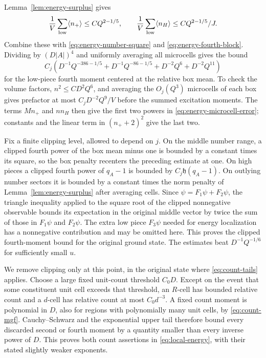 Lemma~\ref{lem:energy-surplus} gives
\begin{equation}\label{eq:energy-gap-counts}
 \frac1V\sum_{\rm low}\langle n_+\rangle\le CQ^{2-1/5},\qquad
 \frac1V\sum_{\rm low}\langle n_H\rangle\le CQ^{2-1/5}/J.
\end{equation}
Combine these with \eqref{eq:energy-number-square} and
\eqref{eq:energy-fourth-block}.  Dividing by $(D|A|)^4$ and uniformly
averaging all microcells gives the bound
\begin{equation}\label{eq:energy-microcell-error}
 C_j\left(D^{-1}Q^{-386-1/5}+D^{-1}Q^{-86-1/5}
                         +D^{-2}Q^6+D^{-2}Q^{11}\right)
\end{equation}
for the low-piece fourth moment centered at the relative box mean.
To check the volume factors, $n^2\le CD^2Q^6$, and averaging the
$O_j(Q^3)$ microcells of each box gives prefactor at most
$C_jD^{-2}Q^9/V$ before the summed excitation moments.
The terms $Mn_+$ and $nn_H$ then give the first two powers in
\eqref{eq:energy-microcell-error}; constants and the linear term in
$(n_++2)^2$ give the last two.

Fix a finite clipping level, allowed to depend on $j$.
On the middle number range, a clipped fourth power of the box mean
minus one is bounded by a constant times its square, so the box penalty
recenters the preceding estimate at one.  On high pieces a clipped
fourth power of $q_A-1$ is bounded by $C_j\mathfrak h(q_A-1)$.
On outlying number sectors it is bounded by a constant times the norm
penalty of Lemma~\ref{lem:energy-surplus} after averaging cells.
Since $\psi=F_1\psi+F_2\psi$, the triangle inequality applied to the
square root of the clipped nonnegative observable bounds its
expectation in the original middle vector by twice the sum of those
in $F_1\psi$ and $F_2\psi$.  The extra low piece $F_3\psi$ needed for
energy localization has a nonnegative contribution and may be omitted
here.  This proves the clipped fourth-moment bound for the original
ground state.  The estimates beat $D^{-1}Q^{-1/6}$ for sufficiently
small $u$.

We remove clipping only at this point, in the original state where
\eqref{eq:count-tails} applies.  Choose a large fixed unit-count threshold
$C_0D$.  Except on the event that some constituent unit cell exceeds
that threshold, an $R$-cell has bounded relative count and a $d$-cell
has relative count at most $C_0d^{-3}$.  A fixed count moment is
polynomial in $D$, also for regions with polynomially many unit cells,
by \eqref{eq:count-mgf}.  Cauchy--Schwarz and the exponential upper tail
therefore bound every discarded second or fourth moment by a quantity
smaller than every inverse power of $D$.  This proves both count
assertions in \eqref{eq:local-energy}, with their stated slightly weaker
exponents.

